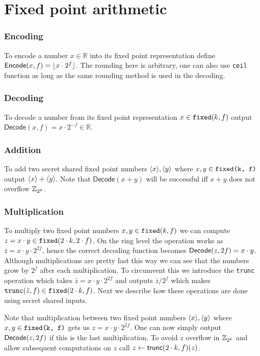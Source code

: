 \section{Fixed point arithmetic}
\label{app:fixed-point}

\subsubsection{Encoding} To encode a number $x \in \mathbb{R}$ into its fixed
point representation define $\mathsf{Encode}(x, f) = \lfloor x \cdot 2^f\rfloor$.
The rounding here is arbitrary, one can also use \verb|ceil| function as long
as the same rounding method is used in the decoding.

\subsubsection{Decoding} To decode a number from its fixed point representation
$x \in \verb|fixed|(k, f)$ output $\mathsf{Decode}(x, f) = x \cdot 2^{-f} \in \mathbb{R}$.

\subsubsection{Addition} To add two secret shared fixed point numbers
$\langle {x} \rangle, \langle {y} \rangle$ where $x,y \in \verb|fixed(k, f)|$ output
$\langle {x} \rangle+\langle {y} \rangle$. Note that $\mathsf{Decode}(x+y)$ will be successful
iff $x+y$ does not overflow $\mathbb{Z}_{2^k}$.

\subsubsection{Multiplication}

To multiply two fixed point numbers $x, y \in \verb|fixed|(k, f)$ we can
compute $z = x \cdot y \in \verb|fixed|(2 \cdot k, 2\cdot f)$. On the ring
level the operation works as $\bar{z} = x \cdot y \cdot 2 ^ {2f}$, hence the
correct decoding function becomes $\mathsf{Decode}(z, 2f) = x \cdot y$. Although
multiplications are pretty fast this way we can see that the numbers grow by
$2^f$ after each multiplication. To circumvent this we introduce the
\verb|trunc| operation which takes $\bar{z} = x \cdot y \cdot 2^{2f}$ and outputs $\bar{z} / 2^{f}$
which makes $\verb|trunc|(\bar{z}, f) \in \verb|fixed|(2 \cdot k, f)$.
Next we describe how these operations are done using secret shared inputs.

 Note that
multiplication between two fixed point numbers $\langle {x} \rangle, \langle {y} \rangle$ where
$x,y \in \verb|fixed(k, f)|$ gets us $z = x \cdot y \cdot 2^{2f}$. One can
now simply output $\mathsf{Decode}(z, 2f)$ if this is the last multiplication.
To avoid $z$ overflow in $\mathbb{Z}_{2^k}$ and allow
subsequent computations on $z$ call $z \gets \mathsf{trunc}(2 \cdot k, f)(z)$.

